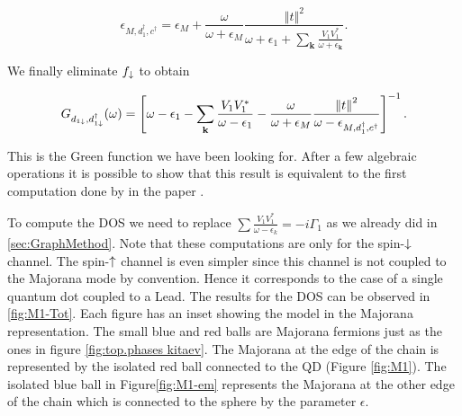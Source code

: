  \begin{equation}
    \epsilon_{M,d_1^\dagger,c^\dagger}= \epsilon_{M}+\frac{\omega}{\omega+\epsilon_{M}}\frac{\left\Vert t\right\Vert ^{2}}{\omega+\epsilon_{1}+\sum_{\mathbf{k}}\frac{V_{1}V_{1}^{*}}{\omega+\epsilon_{\mathbf{k}}}}.
\end{equation}
 
 \noindent We finally eliminate $f_\downarrow$ to obtain 
 
\begin{equation}
    G_{d_{1\downarrow},d_{1\downarrow}^{\dagger}}(\omega)=\left[\omega-\epsilon_{1}-\sum_{\mathbf{k}}\frac{V_{1}V_{1}^{*}}{\omega-\epsilon_{1}}-\frac{\omega}{\omega+\epsilon_{M}}\frac{\left\Vert t\right\Vert ^{2}}{\omega -\epsilon_{M,d_1^\dagger,c^\dagger}}\right]^{-1}.
\end{equation}

\noindent This is the Green function we have been looking for. After a few algebraic operations it is possible to show that this result is equivalent to the first computation done by \citeauthor{liu_detecting_2011}  in the paper \cite{liu_detecting_2011}. 




To compute the DOS we need to replace $\sum \frac{V_1V^*_1}{\omega -\epsilon_k}= -i\Gamma_1$ as we already did in \ref{sec:GraphMethod}. Note that these computations are only for the spin-$\downarrow$ channel. The spin-$\uparrow$ channel is even simpler since this channel is not coupled to the Majorana mode by convention. Hence it corresponds to the case of a single quantum dot coupled to a Lead.  The results for the DOS can be observed in \ref{fig:M1-Tot}. Each figure has an inset showing the model in the Majorana representation. The small blue and red balls are Majorana fermions just as the ones in figure \ref{fig:top.phases kitaev}. The Majorana at the edge of the  chain is represented by the isolated red ball connected to the QD (Figure \ref{fig:M1}). The isolated blue ball in Figure\ref{fig:M1-em} represents the Majorana at the other edge of the chain which is connected to the sphere by the parameter $\epsilon$. 



